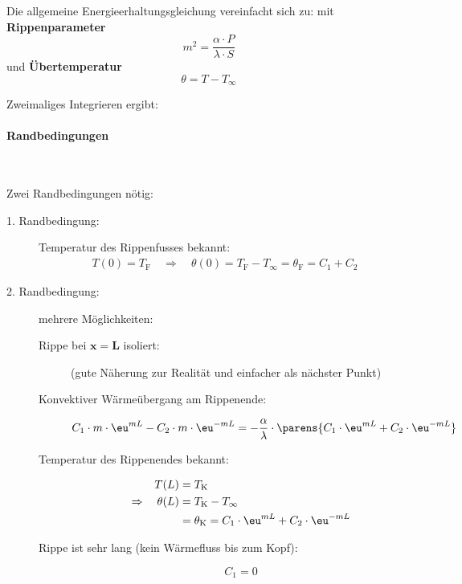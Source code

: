 			Die allgemeine Energieerhaltungsgleichung vereinfacht sich zu:
			mit \textbf{Rippenparameter}
			\[
				m^2 = \frac{\alpha \cdot P}{\lambda \cdot S}
			\]
			und \textbf{Übertemperatur}
			\[
				\theta = T - T_\infty
			\]
			
			Zweimaliges Integrieren ergibt:
			
			\paragraph{Randbedingungen} %
				~
				
				Zwei Randbedingungen nötig:
				\begin{description}
					\item[1. Randbedingung:] Temperatur des Rippenfusses bekannt:
						\begin{align*}
							T(0) = T_\text{F} \quad \Rightarrow \quad \theta(0) = T_\text{F} - T_\infty = \theta_\text{F} = C_1 + C_2
						\end{align*}
					\item[2. Randbedingung:] mehrere Möglichkeiten:
						\begin{description}
							\item[Rippe bei $\boldsymbol{x = L}$ isoliert:] (gute Näherung zur Realität und einfacher als nächster Punkt)
							\item[Konvektiver Wärmeübergang am Rippenende:]
								\[
									C_1 \cdot m \cdot \eu^{mL} - C_2 \cdot m \cdot \eu^{-mL} = - \frac{\alpha}{\lambda} \cdot \parens{C_1 \cdot \eu^{mL} + C_2 \cdot \eu^{-mL}}
								\]
							\item[Temperatur des Rippenendes bekannt:]
								\begin{align*}
									T(L) &= T_\text{K} \\
									\Rightarrow \quad \theta(L) &= T_\text{K} - T_\infty \\
									&= \theta_\text{K} = C_1 \cdot \eu^{mL} + C_2 \cdot \eu^{-mL}
								\end{align*}
							\item[Rippe ist sehr lang (kein Wärmefluss bis zum Kopf):]
								\[
									C_1 = 0
								\]
						\end{description}
				\end{description}
			
